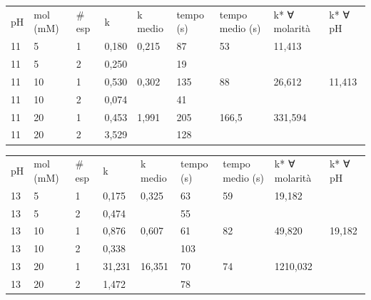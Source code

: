 \begin{center}
\begin{tabular}{lllllllll}
pH & mol (mM) & \# esp & k           & k medio     & tempo (s) & tempo medio (s) & k* ∀ molarità & k* ∀ pH     \\
11 & 5            & 1              & 0,180 & 0,215 & 87        & 53              & 11,413   &             \\
11 & 5             & 2              & 0,250 &             & 19        &                 &               &             \\
11 & 10            & 1              & 0,530 & 0,302 & 135       & 88              & 26,612   & 11,413 \\
11 & 10            & 2              & 0,074 &             & 41        &                 &               &             \\
11 & 20            & 1              & 0,453 & 1,991 & 205       & 166,5           & 331,594   &             \\
11 & 20            & 2              & 3,529 &             & 128       &                 &               &            
\end{tabular}
\end{center}

\begin{center}
\begin{tabular}{lllllllll}
pH & mol (mM) & \# esp & k      & k medio & tempo (s) & tempo medio (s) & k* ∀ molarità & k* ∀ pH \\
13 & 5        & 1      & 0,175  & 0,325   & 63        & 59              & 19,182        &         \\
13 & 5        & 2      & 0,474  &         & 55        &                 &               &         \\
13 & 10       & 1      & 0,876  & 0,607   & 61        & 82              & 49,820        & 19,182  \\
13 & 10       & 2      & 0,338  &         & 103       &                 &               &         \\
13 & 20       & 1      & 31,231 & 16,351  & 70        & 74              & 1210,032      &         \\
13 & 20       & 2      & 1,472  &         & 78        &                 &               &     
\end{tabular}
\end{center}


